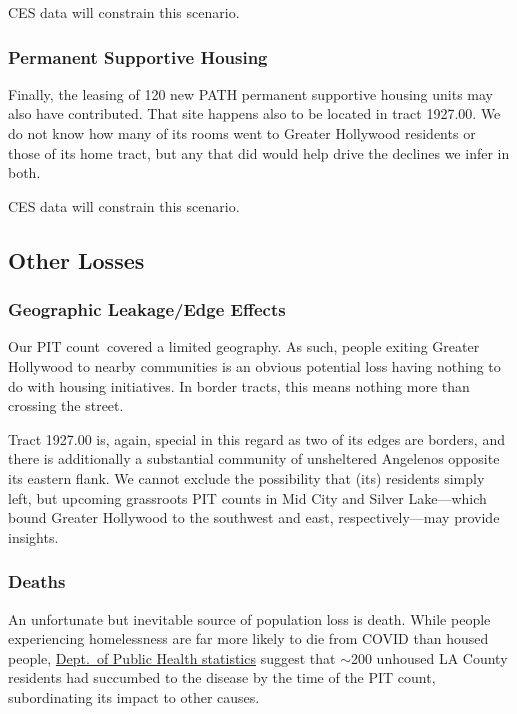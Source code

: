 \documentclass[11pt,twocolumn]{article}
\def\Count{count}
\def\resp{respectively}
\begin{document}
CES data will constrain this scenario.

\subsubsection{Permanent Supportive Housing}

Finally, the leasing of 120 new PATH permanent supportive housing units may also have contributed. 
That site happens also to be located in tract 1927.00. We do not know how many of its rooms went to Greater Hollywood 
residents or those of its home tract, but any that did would help drive the declines we infer in both.

CES data will constrain this scenario.

\subsection{Other Losses}

\subsubsection{Geographic Leakage/Edge Effects}

Our PIT \Count\ covered a limited geography. As such, people exiting Greater Hollywood to nearby communities
is an obvious potential loss having nothing to do with housing initiatives. In border tracts, this means nothing more than
crossing the street. 

Tract 1927.00 is, again, special in this regard as two of its edges are borders, and there is additionally a substantial 
community of unsheltered Angelenos opposite its eastern flank. We cannot exclude the possibility that (its) residents simply 
left, but upcoming grassroots PIT counts in Mid City and Silver Lake---which bound Greater Hollywood to the southwest and 
east, \resp---may provide insights.

\subsubsection{Deaths}

An unfortunate but inevitable source of population loss is death. While people experiencing homelessness are far more 
likely to die from COVID than housed people, \href{http://publichealth.lacounty.gov/media/coronavirus/docs/SummaryReport_People_Experiencing_Homelessness.pdf}
{Dept.\ of Public Health statistics} suggest that $\sim$200 unhoused LA County residents had succumbed to the 
disease by the time of the PIT count, subordinating its impact to other causes.
\end{document}
